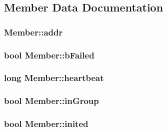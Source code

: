\subsection{Member Data Documentation}
\hypertarget{class_member_a15255ad694aab6b42313f01d9f1c2b03}{}
\subsubsection[{addr}]{ Member\+::addr}\label{class_member_a15255ad694aab6b42313f01d9f1c2b03}
\hypertarget{class_member_adf9e67156c652455a281dfaeed31e4b3}{}
\subsubsection[{b\+Failed}]{\setlength{\rightskip}{0pt plus 5cm}bool Member\+::b\+Failed}\label{class_member_adf9e67156c652455a281dfaeed31e4b3}
\hypertarget{class_member_a112370796bf495cafda11827a21682a4}{}
\subsubsection[{heartbeat}]{\setlength{\rightskip}{0pt plus 5cm}long Member\+::heartbeat}\label{class_member_a112370796bf495cafda11827a21682a4}
\hypertarget{class_member_aaa10136152397774c018ad7775369e55}{}
\subsubsection[{in\+Group}]{\setlength{\rightskip}{0pt plus 5cm}bool Member\+::in\+Group}\label{class_member_aaa10136152397774c018ad7775369e55}
\hypertarget{class_member_a1c7380a6632aecda712316ca24f3f015}{}
\subsubsection[{inited}]{\setlength{\rightskip}{0pt plus 5cm}bool Member\+::inited}\label{class_member_a1c7380a6632aecda712316ca24f3f015}
\hypertarget{class_member_a7c3872c420af12628ce50bbc66010842}{}
